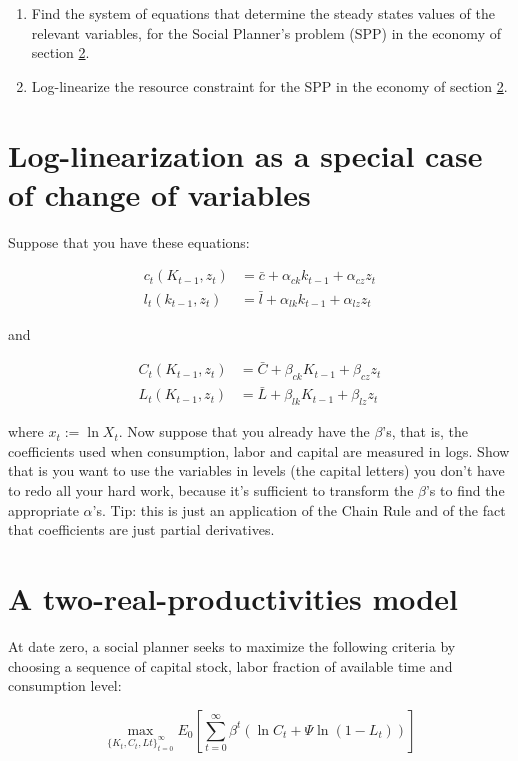 \documentclass[11pt]{article}
\begin{document}
\begin{enumerate}
\item Find the system of equations that determine the steady states values of the relevant variables, for the Social Planner's problem (SPP) in the economy of section \ref{sec:two-prod-model}.
\item Log-linearize the resource constraint for the SPP in the economy of section \ref{sec:two-prod-model}. 
\end{enumerate}

\section{Log-linearization as a special case of change of variables}

Suppose that you have these equations:

\begin{align}
c_t(K_{t-1}, z_t) & = \bar{c} + \alpha_{ck} k_{t-1} + \alpha_{cz} z_t \\
l_t(k_{t-1}, z_t) & = \bar{l} + \alpha_{lk} k_{t-1} + \alpha_{lz} z_t
\end{align}

and

\begin{align}
C_t(K_{t-1}, z_t) & = \bar{C} + \beta_{ck} K_{t-1} + \beta_{cz} z_t \\
L_t(K_{t-1}, z_t) & = \bar{L} + \beta_{lk} K_{t-1} + \beta_{lz} z_t
\end{align}

where $x_t := \ln X_t$. Now suppose that you already have the $\beta$'s, that is, the coefficients used when consumption, labor and capital are measured in logs. Show that is you want to use the variables in levels (the capital letters) you don't have to redo all your hard work, because it's sufficient to transform the $\beta$'s to find the appropriate $\alpha$'s. Tip: this is just an application of the Chain Rule and of the fact that coefficients are just partial derivatives.


\section{A two-real-productivities  model}\label{sec:two-prod-model}

At date zero, a social planner seeks to maximize the following criteria  by choosing a sequence of capital stock, labor fraction of available time and consumption level: 

\[\max_{\{ K_t,C_t,Lt\}_{t=0}^{\infty}} E_0 \left[ \sum_{t=0}^{\infty} \beta^t \left( \ln C_t + \Psi \ln (1-L_t)\right) \right]    \]
\end{document}
